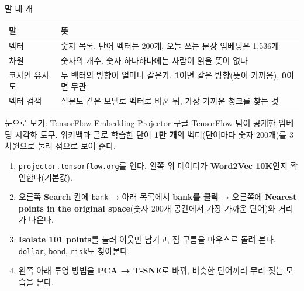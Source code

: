 \begin{frame}{ 말 네 개}
\begin{tabularx}{\textwidth}{@{}l X@{}}
\toprule
\textbf{말} & \textbf{뜻} \\
\midrule
벡터 & 숫자 목록. 단어 벡터는 \num{200개}, 오늘 쓰는 문장 임베딩은 \num{1,536개} \\
차원 & 숫자의 개수. 숫자 하나하나에는 사람이 읽을 뜻이 없다 \\
코사인 유사도 & 두 벡터의 방향이 얼마나 같은가. \textbf{1}이면 같은 방향(뜻이 가까움), \textbf{0}이면 무관 \\
벡터 검색 & 질문도 같은 모델로 벡터로 바꾼 뒤, 가장 가까운 청크를 찾는 것 \\
\bottomrule
\end{tabularx}
\end{frame}

\begin{frame}{ \circzero{} 눈으로 보기: TensorFlow Embedding Projector }
\small
구글 TensorFlow 팀이 공개한 임베딩 시각화 도구. 위키백과 글로 학습한 단어 \textbf{1만 개}의 벡터(단어마다 숫자 200개)를 3차원으로 눌러 점으로 보여 준다.
\begin{enumerate}\setlength\itemsep{3pt}
\item \texttt{projector.tensorflow.org}를 연다. 왼쪽 위 데이터가 \textbf{Word2Vec 10K}인지 확인한다(기본값).
\item 오른쪽 \textbf{Search} 칸에 \texttt{bank} → 아래 목록에서 \textbf{bank를 클릭} → 오른쪽에 \textbf{Nearest points in the original space}(숫자 200개 공간에서 가장 가까운 단어)와 거리가 나온다.\\
\item \textbf{Isolate 101 points}를 눌러 이웃만 남기고, 점 구름을 마우스로 돌려 본다. \texttt{dollar}, \texttt{bond}, \texttt{risk}도 찾아본다.
\item 왼쪽 아래 투영 방법을 \textbf{PCA → T-SNE}로 바꿔, 비슷한 단어끼리 무리 짓는 모습을 본다.
\end{enumerate}
\end{frame}


